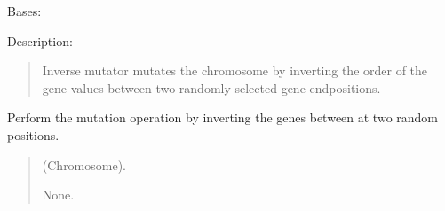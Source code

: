 \documentclass[letterpaper,10pt,english]{sphinxmanual}
\begin{document}
\begin{fulllineitems}
\label{\detokenize{pygenalgo.operators.mutation:pygenalgo.operators.mutation.inverse_mutator.InverseMutator}}
\pysigstartsignatures
{}
\pysigstopsignatures
\sphinxAtStartPar
Bases: {\hyperref[\detokenize{pygenalgo.operators.mutation:pygenalgo.operators.mutation.mutate_operator.MutationOperator}]{}}

\sphinxAtStartPar
Description:
\begin{quote}

\sphinxAtStartPar
Inverse mutator mutates the chromosome by inverting the order of
the gene values between two randomly selected gene end\sphinxhyphen{}positions.
\end{quote}

\begin{fulllineitems}
\label{\detokenize{pygenalgo.operators.mutation:pygenalgo.operators.mutation.inverse_mutator.InverseMutator.mutate}}
\pysigstartsignatures
{}
\pysigstopsignatures
\sphinxAtStartPar
Perform the mutation operation by inverting the genes
between at two random positions.
\begin{quote}\begin{description}
\sphinxAtStartPar
{} \textendash{} (Chromosome).

\sphinxAtStartPar
None.

\end{description}\end{quote}

\end{fulllineitems}


\end{fulllineitems}
\end{document}
